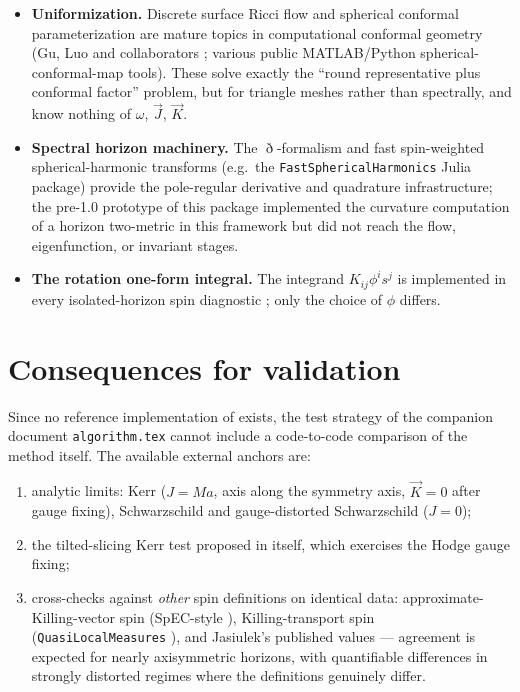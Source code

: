 \documentclass[11pt]{article}
\newcommand{\vJ}{\vec{J}}
\newcommand{\vK}{\vec{K}}
\begin{document}
\begin{itemize}
\item \textbf{Uniformization.}  Discrete surface Ricci flow and spherical
  conformal parameterization are mature topics in computational conformal
  geometry (Gu, Luo and collaborators \cite{gu2008}; various public
  MATLAB/Python spherical-conformal-map tools).  These solve exactly the
  ``round representative plus conformal factor'' problem, but for triangle
  meshes rather than spectrally, and know nothing of $\omega$, $\vJ$,
  $\vK$.
\item \textbf{Spectral horizon machinery.}  The $\eth$-formalism
  \cite{gomez1997} and fast spin-weighted spherical-harmonic transforms
  (e.g.\ the \texttt{FastSphericalHarmonics} Julia package) provide the
  pole-regular derivative and quadrature infrastructure; the pre-1.0
  prototype of this package implemented the curvature computation of
  a horizon two-metric in this framework but did not reach the flow,
  eigenfunction, or invariant stages.
\item \textbf{The rotation one-form integral.}  The integrand
  $K_{ij}\phi^i s^j$ is implemented in every isolated-horizon spin
  diagnostic \cite{dkss2003,qlm}; only the choice of $\phi$ differs.
\end{itemize}

\section{Consequences for validation}

Since no reference implementation of \cite{korzynski2007} exists, the test
strategy of the companion document \texttt{algorithm.tex} cannot include a
code-to-code comparison of the method itself.  The available external
anchors are:
\begin{enumerate}
\item analytic limits: Kerr ($J=Ma$, axis along the symmetry axis,
  $\vK=0$ after gauge fixing), Schwarzschild and gauge-distorted
  Schwarzschild ($J=0$);
\item the tilted-slicing Kerr test proposed in \cite{korzynski2007} itself,
  which exercises the Hodge gauge fixing;
\item cross-checks against \emph{other} spin definitions on identical data:
  approximate-Killing-vector spin (SpEC-style \cite{cookwhiting2007}),
  Killing-transport spin (\texttt{QuasiLocalMeasures} \cite{qlm}), and
  Jasiulek's published values \cite{jasiulek2009} --- agreement is expected
  for nearly axisymmetric horizons, with quantifiable differences in
  strongly distorted regimes where the definitions genuinely differ.
\end{enumerate}
\end{document}
